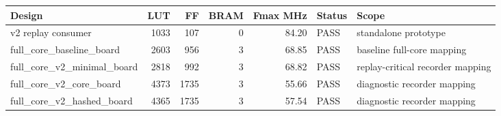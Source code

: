 \begin{tabular}{lrrrrll}
\toprule
Design & LUT & FF & BRAM & Fmax MHz & Status & Scope \\
\midrule
v2 replay consumer & 1033 & 107 & 0 & 84.20 & PASS & standalone prototype \\
full\_core\_baseline\_board & 2603 & 956 & 3 & 68.85 & PASS & baseline full-core mapping \\
full\_core\_v2\_minimal\_board & 2818 & 992 & 3 & 68.82 & PASS & replay-critical recorder mapping \\
full\_core\_v2\_core\_board & 4373 & 1735 & 3 & 55.66 & PASS & diagnostic recorder mapping \\
full\_core\_v2\_hashed\_board & 4365 & 1735 & 3 & 57.54 & PASS & diagnostic recorder mapping \\
\bottomrule
\end{tabular}
